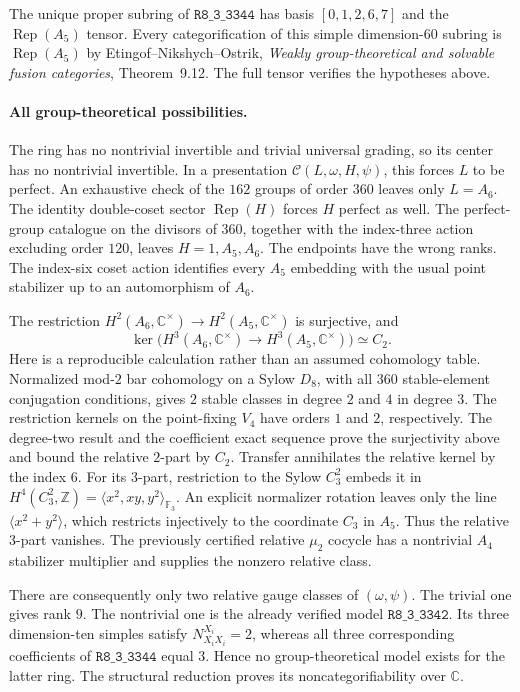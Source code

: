 The unique proper subring of $\mathtt{R8\_3\_3344}$ has basis
$[0,1,2,6,7]$ and the $\operatorname{Rep}(A_5)$ tensor.
Every categorification of this simple dimension-$60$ subring is
$\operatorname{Rep}(A_5)$ by Etingof--Nikshych--Ostrik,
\emph{Weakly group-theoretical and solvable fusion categories},
Theorem~9.12. The full tensor verifies the hypotheses above.

\paragraph{All group-theoretical possibilities.}
The ring has no nontrivial invertible and trivial universal grading,
so its center has no nontrivial invertible. In a presentation
$\mathcal C(L,\omega,H,\psi)$, this forces $L$ to be perfect.
An exhaustive check of the $162$ groups of order $360$ leaves only
$L=A_6$. The identity double-coset sector $\operatorname{Rep}(H)$
forces $H$ perfect as well. The perfect-group catalogue on the divisors
of $360$, together with the index-three action excluding order $120$,
leaves $H=1,A_5,A_6$. The endpoints have the wrong ranks. The index-six
coset action identifies every $A_5$ embedding with the usual point
stabilizer up to an automorphism of $A_6$.

The restriction $H^2(A_6,\mathbb C^\times)\to
H^2(A_5,\mathbb C^\times)$ is surjective, and
\[
 \ker\bigl(H^3(A_6,\mathbb C^\times)\longrightarrow
 H^3(A_5,\mathbb C^\times)\bigr)\simeq C_2.
\]
Here is a reproducible calculation rather than an assumed cohomology
table. Normalized mod-$2$ bar cohomology on a Sylow $D_8$, with all
$360$ stable-element conjugation conditions, gives $2$ stable classes
in degree $2$ and $4$ in degree $3$. The restriction kernels on the
point-fixing $V_4$ have orders $1$ and $2$, respectively.
The degree-two result and the coefficient exact sequence prove the
surjectivity above and bound the relative $2$-part by $C_2$.
Transfer annihilates the relative kernel by the index $6$.
For its $3$-part, restriction to the Sylow $C_3^2$ embeds it in
$H^4(C_3^2,\mathbb Z)=\langle x^2,xy,y^2\rangle_{\mathbb F_3}$.
An explicit normalizer rotation leaves only the line
$\langle x^2+y^2\rangle$, which restricts injectively to the coordinate
$C_3$ in $A_5$. Thus the relative $3$-part vanishes.
The previously certified relative $\mu_2$ cocycle has a nontrivial
$A_4$ stabilizer multiplier and supplies the nonzero relative class.

There are consequently only two relative gauge classes of
$(\omega,\psi)$. The trivial one gives rank $9$.
The nontrivial one is the already verified model
$\mathtt{R8\_3\_3342}$. Its three dimension-ten simples satisfy
$N_{X_iX_i}^{X_i}=2$, whereas all three corresponding coefficients
of $\mathtt{R8\_3\_3344}$ equal $3$. Hence no group-theoretical model
exists for the latter ring. The structural reduction proves its
noncategorifiability over $\mathbb C$.

